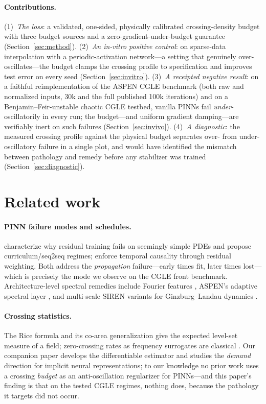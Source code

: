\documentclass[10pt]{article}
\begin{document}
\paragraph{Contributions.}
(1)~\emph{The loss}: a validated, one-sided, physically calibrated crossing-density
budget with three budget sources and a zero-gradient-under-budget guarantee
(Section~\ref{sec:method}).
(2)~\emph{An in-vitro positive control}: on sparse-data interpolation with a
periodic-activation network---a setting that genuinely over-oscillates---the budget
clamps the crossing profile to specification and improves test error on every seed
(Section~\ref{sec:invitro}).
(3)~\emph{A receipted negative result}: on a faithful reimplementation of the ASPEN
CGLE benchmark (both raw and normalized inputs, 30k and the full published 100k
iterations) and on a Benjamin--Feir-unstable chaotic CGLE testbed, vanilla PINNs
fail \emph{under}-oscillatorily in every run; the budget---and uniform gradient
damping---are verifiably inert on such failures (Section~\ref{sec:invivo}).
(4)~\emph{A diagnostic}: the measured crossing profile against the physical budget
separates over- from under-oscillatory failure in a single plot, and would have
identified the mismatch between pathology and remedy before any stabilizer was
trained (Section~\ref{sec:diagnostic}).

\section{Related work}
\label{sec:related}

\paragraph{PINN failure modes and schedules.} \citet{krishnapriyan2021failure}
characterize why residual training fails on seemingly simple PDEs and propose
curriculum/seq2seq regimes; \citet{wang2024causal} enforce temporal causality
through residual weighting. Both address the \emph{propagation} failure---early
times fit, later times lost---which is precisely the mode we observe on the CGLE
front benchmark. Architecture-level spectral remedies include Fourier features
\citep{tancik2020fourier}, ASPEN's adaptive spectral layer \citep{aspen2025}, and
multi-scale SIREN variants for Ginzburg--Landau dynamics
\citep{chrisnanto2026sirenpinn}.

\paragraph{Crossing statistics.} The Rice formula and its co-area generalization
\citep{rice1944,kac1943,adler2007random,azais2009level} give the expected level-set
measure of a field; zero-crossing rates as frequency surrogates are classical
\citep{kedem1986zerocrossings}. Our companion paper \citep{howe2026levelcrossing}
develops the differentiable estimator and studies the \emph{demand} direction for
implicit neural representations; to our knowledge no prior work uses a crossing
\emph{budget} as an anti-oscillation regularizer for PINNs---and this paper's
finding is that on the tested CGLE regimes, nothing does, because the pathology it
targets did not occur.
\end{document}
